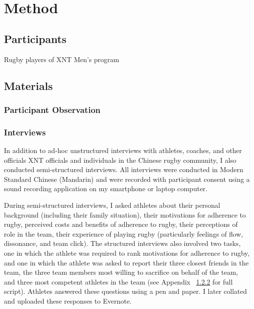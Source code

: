 {  %



\section{Method}


\subsection{Participants}

Rugby players of XNT Men's program



  \subsection{Materials}

  \subsubsection{Participant Observation}



  \subsubsection{Interviews}
  In addition to ad-hoc unstructured interviews with athletes, coaches, and other officials XNT officials and individuals in the Chinese rugby community, I also conducted semi-structured interviews.  All interviews were conducted in Modern Standard Chinese (Mandarin) and were recorded with participant consent using a sound recording application on my smartphone or laptop computer.

  During semi-structured interviews, I asked athletes about their personal background (including their family situation), their motivations for adherence to rugby, perceived costs and benefits of adherence to rugby, their perceptions of role in the team, their experience of playing rugby (particularly feelings of flow, dissonance, and team click).  The structured interviews also involved two tasks, one in which the athlete was required to rank motivations for adherence to rugby, and one in which the athlete was asked to report their three closest friends in the team, the three team members most willing to sacrifice on behalf of the team, and three most competent athletes in the team (see Appendix ~\ref{} for full script). Athletes answered these questions using a pen and paper. I later collated and uploaded these responses to Evernote.



}

